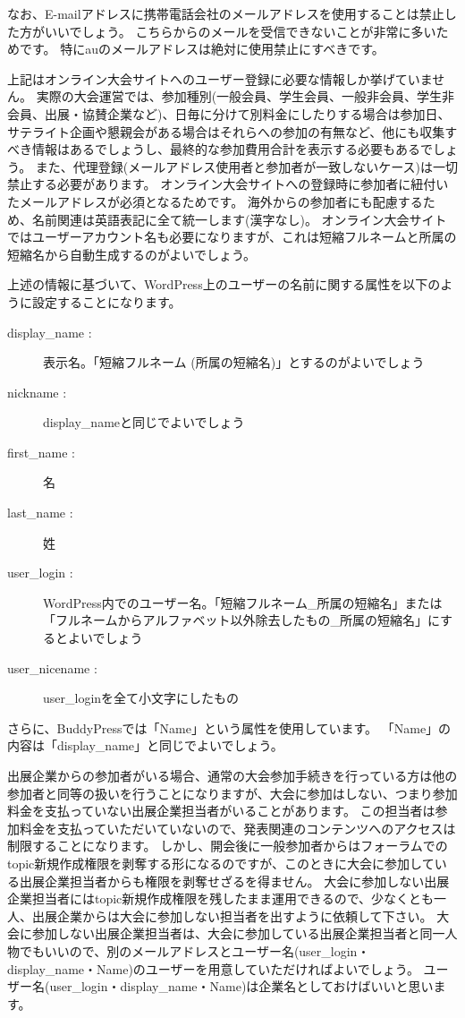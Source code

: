 \documentclass[titlepage,10pt,a4paper,uplatex]{jsbook}
\begin{document}
なお、E-mailアドレスに携帯電話会社のメールアドレスを使用することは禁止した方がいいでしょう。
こちらからのメールを受信できないことが非常に多いためです。
特にauのメールアドレスは絶対に使用禁止にすべきです。

上記はオンライン大会サイトへのユーザー登録に必要な情報しか挙げていません。
実際の大会運営では、参加種別(一般会員、学生会員、一般非会員、学生非会員、出展・協賛企業など)、日毎に分けて別料金にしたりする場合は参加日、サテライト企画や懇親会がある場合はそれらへの参加の有無など、他にも収集すべき情報はあるでしょうし、最終的な参加費用合計を表示する必要もあるでしょう。
また、代理登録(メールアドレス使用者と参加者が一致しないケース)は一切禁止する必要があります。
オンライン大会サイトへの登録時に参加者に紐付いたメールアドレスが必須となるためです。
海外からの参加者にも配慮するため、名前関連は英語表記に全て統一します(漢字なし)。
オンライン大会サイトではユーザーアカウント名も必要になりますが、これは短縮フルネームと所属の短縮名から自動生成するのがよいでしょう。

上述の情報に基づいて、WordPress上のユーザーの名前に関する属性を以下のように設定することになります。

\begin{description}
\item[display\_name : ] 表示名。「短縮フルネーム (所属の短縮名)」とするのがよいでしょう
\item[nickname : ] display\_nameと同じでよいでしょう
\item[first\_name : ] 名
\item[last\_name : ] 姓
\item[user\_login : ] WordPress内でのユーザー名。「短縮フルネーム\_所属の短縮名」または「フルネームからアルファベット以外除去したもの\_所属の短縮名」にするとよいでしょう
\item[user\_nicename : ] user\_loginを全て小文字にしたもの
\end{description}

さらに、BuddyPressでは「Name」という属性を使用しています。
「Name」の内容は「display\_name」と同じでよいでしょう。

出展企業からの参加者がいる場合、通常の大会参加手続きを行っている方は他の参加者と同等の扱いを行うことになりますが、大会に参加はしない、つまり参加料金を支払っていない出展企業担当者がいることがあります。
この担当者は参加料金を支払っていただいていないので、発表関連のコンテンツへのアクセスは制限することになります。
しかし、開会後に一般参加者からはフォーラムでのtopic新規作成権限を剥奪する形になるのですが、このときに大会に参加している出展企業担当者からも権限を剥奪せざるを得ません。
大会に参加しない出展企業担当者にはtopic新規作成権限を残したまま運用できるので、少なくとも一人、出展企業からは大会に参加しない担当者を出すように依頼して下さい。
大会に参加しない出展企業担当者は、大会に参加している出展企業担当者と同一人物でもいいので、別のメールアドレスとユーザー名(user\_login・display\_name・Name)のユーザーを用意していただければよいでしょう。
ユーザー名(user\_login・display\_name・Name)は企業名としておけばいいと思います。
\end{document}
